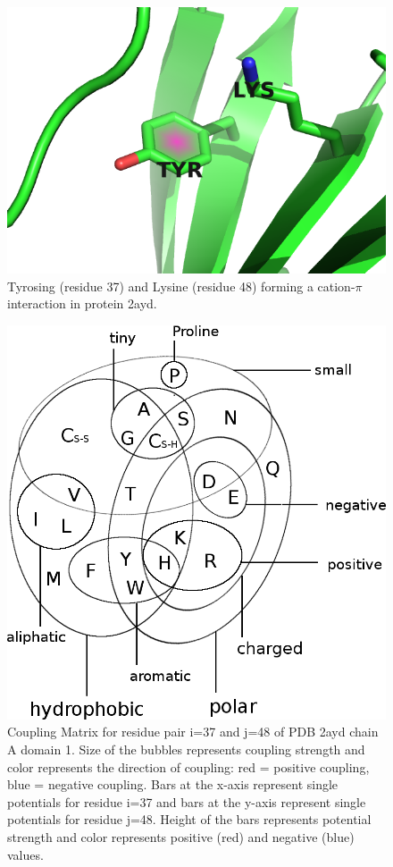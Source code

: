 \documentclass[12pt,a4paper,twoside]{book}
\theoremstyle{definition}
\theoremstyle{definition}
\theoremstyle{remark}
\begin{document}
\begin{figure}
\includegraphics[width=0.5\linewidth]{img/coupling_matrix_analysis/2ayda01_37_48} \caption{Tyrosing (residue 37) and
Lysine (residue 48) forming a cation-\(\pi\) interaction in protein
2ayd.}\label{fig:coupling-matrix-pication-pymol}
\end{figure}










\begin{figure}
\includegraphics[width=1\linewidth]{img/amino_acid_physico_chemical_properties_venn_diagramm} \caption{Coupling Matrix for
residue pair i=37 and j=48 of PDB 2ayd chain A domain 1. Size of the
bubbles represents coupling strength and color represents the direction
of coupling: red = positive coupling, blue = negative coupling. Bars at
the x-axis represent single potentials for residue i=37 and bars at the
y-axis represent single potentials for residue j=48. Height of the bars
represents potential strength and color represents positive (red) and
negative (blue) values.}\label{fig:coupling-matrix-pication-interaction}
\end{figure}
\end{document}
